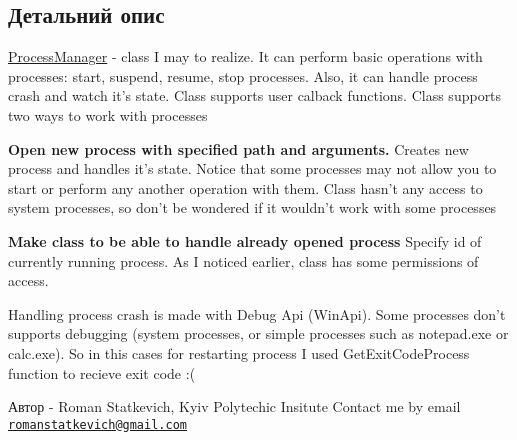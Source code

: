 \subsection{Детальний опис}
\hyperlink{class_process_manager}{Process\+Manager} -\/ class I may to realize. It can perform basic operations with processes\+: start, suspend, resume, stop processes. Also, it can handle process crash and watch it's state. Class supports user calback functions. Class supports two ways to work with processes 
\begin{DoxyItemize}
\item {\bfseries Open new process with specified path and arguments.} Creates new process and handles it's state. Notice that some processes may not allow you to start or perform any another operation with them. Class hasn't any access to system processes, so don't be wondered if it wouldn't work with some processes  
\item {\bfseries Make class to be able to handle already opened process} Specify id of currently running process. As I noticed earlier, class has some permissions of access.  
\end{DoxyItemize}Handling process crash is made with Debug Api (Win\+Api). Some processes don't supports debugging (system processes, or simple processes such as notepad.\+exe or calc.\+exe). So in this cases for restarting process I used Get\+Exit\+Code\+Process function to recieve exit code \+:( \begin{DoxyAuthor}{Автор}
-\/ Roman Statkevich, Kyiv Polytechic Insitute Contact me by email \href{mailto:romanstatkevich@gmail.com}{\tt romanstatkevich@gmail.\+com} 
\end{DoxyAuthor}


